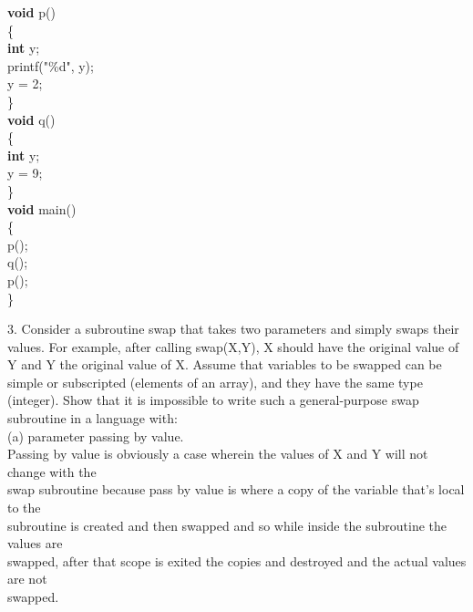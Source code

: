 \documentclass[12pt]{article}
\begin{document}
\begin{flushleft}
{\selectfont 
	
\qquad \qquad \qquad \textbf{void} p()\\
\qquad \qquad \qquad \{\\
\qquad \qquad \qquad \qquad	\textbf{int} y;\\
\qquad \qquad \qquad \qquad		printf("\%d", y);\\
\qquad \qquad \qquad \qquad		y = 2;\\
\qquad \qquad \qquad \}\\
[2mm]
\qquad \qquad \qquad \textbf{void} q()\\
\qquad \qquad \qquad \{\\
\qquad \qquad \qquad \qquad		\textbf{int} y;\\
\qquad \qquad \qquad \qquad		y = 9;\\
\qquad \qquad \qquad \}\\
[2mm]
\qquad \qquad \qquad \textbf{void} main()\\
\qquad \qquad \qquad \{\\
\qquad \qquad \qquad \qquad		p();\\
\qquad \qquad \qquad \qquad		q();\\
\qquad \qquad \qquad \qquad		p();\\
\qquad \qquad \qquad \}\\
[4mm]
}

3. Consider a subroutine swap that takes two parameters and simply swaps their
values. For example, after calling swap(X,Y), X should have the original value of Y and Y the original value of X. Assume that variables to be swapped can be simple or subscripted (elements of an array), and they have the same type (integer). Show that it is impossible to write such a general-purpose swap subroutine in a language with:\\
[2mm]
\qquad (a) parameter passing by value.\\
[2mm]
\qquad \qquad Passing by value is obviously a case wherein the values of X and Y will not change with the\\
\qquad \qquad swap subroutine because pass by value is where a copy of the variable that's local to the\\
\qquad \qquad  subroutine is created and then swapped and so while inside the subroutine the values are\\
\qquad \qquad  swapped, after that scope is exited the copies and destroyed and the actual values are not\\
\qquad \qquad  swapped.\\
[2mm]


\end{flushleft}
\end{document}
